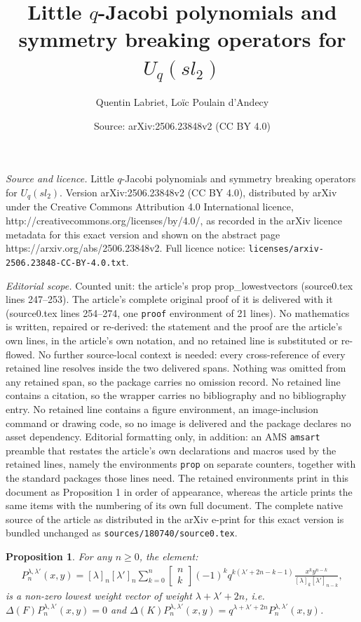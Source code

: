 \documentclass[10pt,a4paper]{amsart}
\title{Little $q$-Jacobi polynomials and symmetry breaking operators for $U_q(sl_2)$}
\author{Quentin Labriet, Lo\"ic Poulain d'Andecy}
\date{Source: arXiv:2506.23848v2 (CC BY 4.0)}
\newtheorem{prop}{Proposition}
\newcommand{\qbinom}[2]{\begin{bmatrix}#1\\#2\end{bmatrix}}
\begin{document}
\maketitle

\noindent\emph{Source and licence.} Little $q$-Jacobi polynomials and symmetry breaking operators for $U_q(sl_2)$. Version arXiv:2506.23848v2 (CC BY 4.0), distributed by arXiv under the Creative Commons Attribution 4.0 International licence, http://creativecommons.org/licenses/by/4.0/, as recorded in the arXiv licence metadata for this exact version and shown on the abstract page https://arxiv.org/abs/2506.23848v2. Full licence notice: \texttt{licenses/arxiv-2506.23848-CC-BY-4.0.txt}.\par\smallskip

\noindent\textit{Editorial scope.} Counted unit: the article's prop prop\_lowestvectors (source0.tex lines 247--253). The article's complete original proof of it is delivered with it (source0.tex lines 254--274, one \texttt{proof} environment of 21 lines). No mathematics is written, repaired or re-derived: the statement and the proof are the article's own lines, in the article's own notation, and no retained line is substituted or re-flowed.  No further source-local context is needed: every cross-reference of every retained line resolves inside the two delivered spans.  Nothing was omitted from any retained span, so the package carries no omission record.  No retained line contains a citation, so the wrapper carries no bibliography and no bibliography entry.  No retained line contains a figure environment, an image-inclusion command or drawing code, so no image is delivered and the package declares no asset dependency.  Editorial formatting only, in addition: an AMS \texttt{amsart} preamble that restates the article's own declarations and macros used by the retained lines, namely the environments \texttt{prop} on separate counters, together with the standard packages those lines need.  The retained environments print in this document as Proposition 1 in order of appearance, whereas the article prints the same items with the numbering of its own full document.  The complete native source of the article as distributed in the arXiv e-print for this exact version is bundled unchanged as \texttt{sources/180740/source0.tex}.
\begin{prop}\label{prop_lowestvectors}
For any $n\geq 0$, the element:
\begin{align}
P_n^{\lambda,\lambda'}(x,y) = [\lambda]_n[\lambda']_n\sum_{k=0}^n \qbinom{n}{k}(-1)^k q^{k(\lambda'+2n-k-1)}\frac{x^ky^{n-k}}{[\lambda]_{k}[\lambda']_{n-k} },
\end{align}
is a non-zero lowest weight vector of weight $\lambda+\lambda'+2n$, i.e. $\Delta(F) P_n^{\lambda,\lambda'}(x,y)=0$ and $\Delta(K) P_n^{\lambda,\lambda'}(x,y)=q^{\lambda+\lambda'+2n}P_n^{\lambda,\lambda'}(x,y)$.
\end{prop}
\end{document}
